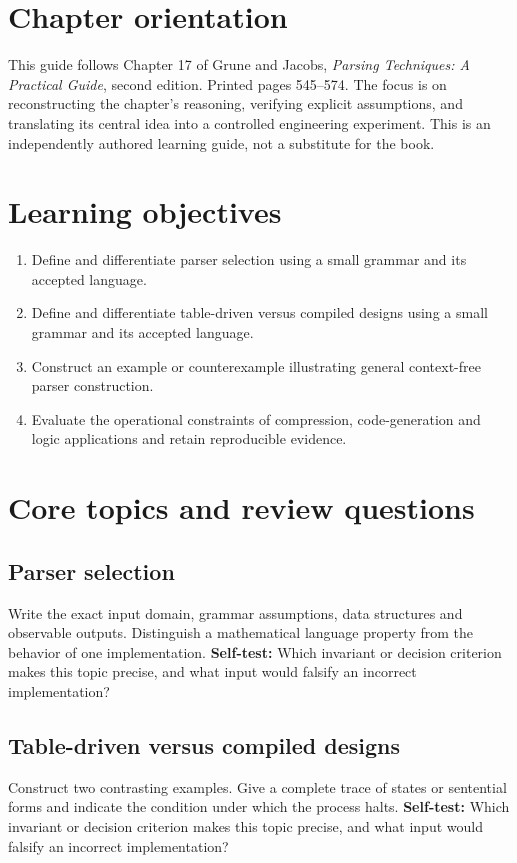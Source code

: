 \documentclass[11pt,letterpaper]{article}
\begin{document}
\makedoctitle\makedocsummary
\tableofcontents\clearpage
\section{Chapter orientation}
This guide follows Chapter 17 of Grune and Jacobs, \emph{Parsing Techniques: A Practical Guide}, second edition. Printed pages 545--574. The focus is on reconstructing the chapter's reasoning, verifying explicit assumptions, and translating its central idea into a controlled engineering experiment. This is an independently authored learning guide, not a substitute for the book.
\section{Learning objectives}
\begin{enumerate}
\item Define and differentiate parser selection using a small grammar and its accepted language.
\item Define and differentiate table-driven versus compiled designs using a small grammar and its accepted language.
\item Construct an example or counterexample illustrating general context-free parser construction.
\item Evaluate the operational constraints of compression, code-generation and logic applications and retain reproducible evidence.
\end{enumerate}
\section{Core topics and review questions}
\subsection{Parser selection}
Write the exact input domain, grammar assumptions, data structures and observable outputs. Distinguish a mathematical language property from the behavior of one implementation.
\textbf{Self-test:} Which invariant or decision criterion makes this topic precise, and what input would falsify an incorrect implementation?
\subsection{Table-driven versus compiled designs}
Construct two contrasting examples. Give a complete trace of states or sentential forms and indicate the condition under which the process halts.
\textbf{Self-test:} Which invariant or decision criterion makes this topic precise, and what input would falsify an incorrect implementation?
\end{document}
